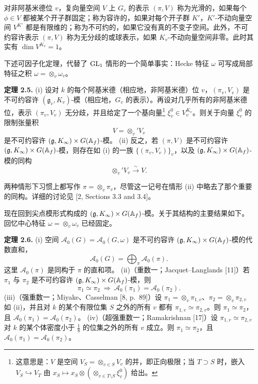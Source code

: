对非阿基米德位 $v$，复向量空间 $V$ 上 $G_v$ 的表示 $(\pi,V)$ 称为光滑的，如果每个 $\phi\in V$ 都被某个开子群固定；称为容许的，如果对每个开子群 $K'$，$K'$-不动向量空间 $V^{K'}$ 都是有限维的；称为不可约的，如果它没有真的不变子空间。此外，不可约容许表示 $(\pi,V)$ 称为无分歧的或球表示，如果 $K_v$-不动向量空间非零。此时其实有 $\dim V^{K_v}=1$。

下述可因子化定理，代替了 $\mathrm{GL}_1$ 情形的一个简单事实：Hecke 特征 $\omega$ 可写成局部特征之积 $\omega=\otimes_v\omega_v$。

\medskip\noindent\textbf{定理 2.5.}\quad
(i) 设对 $k$ 的每个阿基米德（相应地，非阿基米德）位 $v$，$(\pi_v,V_v)$ 是不可约容许 $(\mathfrak{g}_v,K_v)$-模（相应地，$G_v$ 的表示）。再设对几乎所有的非阿基米德位，表示 $(\pi_v,V_v)$ 无分歧，并且给定了一个基向量\footnote{这意思是：$V$ 是空间 $V_S=\otimes_{v\in S}V_v$ 的并，即正向极限；当 $T\supset S$ 时，嵌入 $V_S\hookrightarrow V_T$ 由 $x_S\mapsto x_S\otimes(\otimes_{v\in T\setminus S}\xi_v^0)$ 给出。} $\xi_v^0\in V_v^{K_v}$。则关于向量 $\xi_v^0$ 的限制张量积
\[
V={\otimes_v}'V_v
\]
是不可约容许 $(\mathfrak{g},K_\infty)\times G(\mathbb{A}_f)$-模。
(ii) 反之，若 $(\pi,V)$ 是不可约容许 $(\mathfrak{g},K_\infty)\times G(\mathbb{A}_f)$-模，则存在如 (i) 的一族 $\{(\pi_v,V_v)\}_v$，以及 $(\mathfrak{g},K_\infty)\times G(\mathbb{A}_f)$-模的同构
\[
{\otimes_v}'V_v\overset{\sim}{\longrightarrow}V.
\]

\medskip
两种情形下习惯上都写作 $\pi=\otimes_v\pi_v$，尽管这一记号在情形 (ii) 中略去了那个重要的同构。详细的讨论见 [2, Sections 3.3 and 3.4]。

现在回到尖点模形式构成的 $(\mathfrak{g},K_\infty)\times G(\mathbb{A}_f)$-模。关于其结构的主要结果如下。回忆中心特征 $\omega=\otimes_v\omega_v$ 已经固定。

\medskip\noindent\textbf{定理 2.6.}\quad
(i) 空间 $\mathcal{A}_0(G)=\mathcal{A}_0(G,\omega)$ 是不可约容许 $(\mathfrak{g},K_\infty)\times G(\mathbb{A}_f)$-模的代数直和，
\[
\mathcal{A}_0(G)=\bigoplus_\pi\mathcal{A}_0(\pi).
\]
这里 $\mathcal{A}_0(\pi)$ 是同构于 $\pi$ 的直和项。
(ii)（重数一；Jacquet–Langlands [11]）若 $\pi_1$ 与 $\pi_2$ 是不可约容许 $(\mathfrak{g},K_\infty)\times G(\mathbb{A}_f)$-模，则
\[
\pi_1\simeq\pi_2\ \Longrightarrow\ \mathcal{A}_0(\pi_1)=\mathcal{A}_0(\pi_2).
\]
(iii)（强重数一；Miyake、Casselman [8, p.\ 89]）设 $\pi_1=\otimes_v\pi_{1,v}$、$\pi_2=\otimes_v\pi_{2,v}$ 如 (ii)，并且对 $k$ 的某个有限位集 $S$ 之外的所有 $v$ 都有 $\pi_{1,v}\simeq\pi_{2,v}$。则 $\pi_1\simeq\pi_2$，且 $\mathcal{A}_0(\pi_1)=\mathcal{A}_0(\pi_2)$。
(iv)（超强重数一；Ramakrishnan [17]）设 $\pi_{1,v}\simeq\pi_{2,v}$ 对 $k$ 的某个体密度小于 $\frac18$ 的位集之外的所有 $v$ 成立。则 $\pi_1\simeq\pi_2$，且 $\mathcal{A}_0(\pi_1)=\mathcal{A}_0(\pi_2)$。

